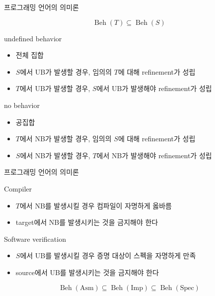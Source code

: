 \documentclass{beamer}
\newcommand\Beh[0]{\operatorname{Beh}}
\begin{document}
\begin{frame}{프로그래밍 언어의 의미론}

  \[ \Beh(T) \subseteq \Beh(S) \]

  \footnotesize
  \begin{block}{undefined behavior}
    \begin{itemize}
      \item 전체 집합
      \item \(S\)에서 UB가 발생할 경우, 임의의 \(T\)에 대해 refinement가 성립
      \item \(T\)에서 UB가 발생할 경우, \(S\)에서 UB가 발생해야 refinement가 성립
    \end{itemize}
  \end{block}

  \pause
  \begin{block}{no behavior}
    \begin{itemize}
      \item 공집합
      \item \(T\)에서 NB가 발생할 경우, 임의의 \(S\)에 대해 refinement가 성립
      \item \(S\)에서 NB가 발생할 경우, \(T\)에서 NB가 발생해야 refinement가 성립
    \end{itemize}
  \end{block}

\end{frame}

\begin{frame}{프로그래밍 언어의 의미론}

  \begin{block} {Compiler}
    \begin{itemize}
      \item \(T\)에서 NB를 발생시킬 경우 컴파일이 자명하게 옳바름
      \item target에서 NB를 발생시키는 것을 금지해야 한다
    \end{itemize}
  \end{block}

  \pause
  \begin{block} {Software verification}
    \begin{itemize}
      \item \(S\)에서 UB를 발생시킬 경우 증명 대상이 스펙을 자명하게 만족
      \item source에서 UB를 발생시키는 것을 금지해야 한다
    \end{itemize}
  \end{block}

  \pause
  \[ \Beh(\text{Asm}) \subseteq \Beh(\text{Imp}) \subseteq \Beh(\text{Spec}) \]
\end{frame}
\end{document}
